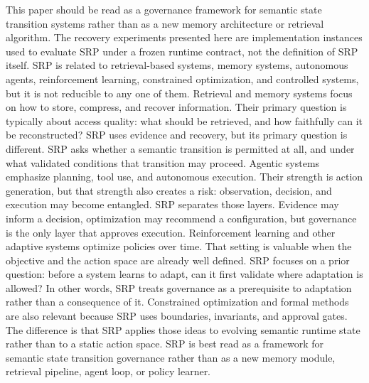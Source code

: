 {}This paper should be read as a governance framework for semantic state transition systems rather than as a new memory architecture or retrieval algorithm. The recovery experiments presented here are implementation instances used to evaluate SRP under a frozen runtime contract, not the definition of SRP itself.\markdownRendererInterblockSeparator
{}
\markdownRendererSectionEnd \markdownRendererSectionBegin
{}\markdownRendererInterblockSeparator
{}SRP is related to retrieval-based systems, memory systems, autonomous agents, reinforcement learning, constrained optimization, and controlled systems, but it is not reducible to any one of them.\markdownRendererParagraphSeparator
{}Retrieval and memory systems focus on how to store, compress, and recover information. Their primary question is typically about access quality: what should be retrieved, and how faithfully can it be reconstructed? SRP uses evidence and recovery, but its primary question is different. SRP asks whether a semantic transition is permitted at all, and under what validated conditions that transition may proceed.\markdownRendererParagraphSeparator
{}Agentic systems emphasize planning, tool use, and autonomous execution. Their strength is action generation, but that strength also creates a risk: observation, decision, and execution may become entangled. SRP separates those layers. Evidence may inform a decision, optimization may recommend a configuration, but governance is the only layer that approves execution.\markdownRendererParagraphSeparator
{}Reinforcement learning and other adaptive systems optimize policies over time. That setting is valuable when the objective and the action space are already well defined. SRP focuses on a prior question: before a system learns to adapt, can it first validate where adaptation is allowed? In other words, SRP treats governance as a prerequisite to adaptation rather than a consequence of it.\markdownRendererParagraphSeparator
{}Constrained optimization and formal methods are also relevant because SRP uses boundaries, invariants, and approval gates. The difference is that SRP applies those ideas to evolving semantic runtime state rather than to a static action space.\markdownRendererInterblockSeparator
{}\markdownRendererSectionBegin
{}\markdownRendererInterblockSeparator
{}SRP is best read as a framework for semantic state transition governance rather than as a new memory module, retrieval pipeline, agent loop, or policy learner.\markdownRendererInterblockSeparator
